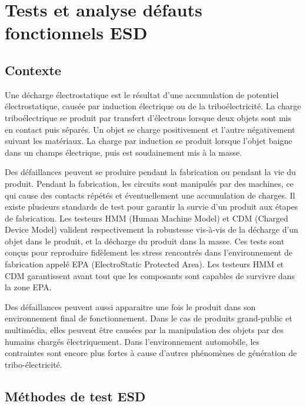 \chapter{Tests et analyse défauts fonctionnels ESD}
\label{chap:1}
\section{Contexte}

Une décharge électrostatique est le résultat d'une accumulation de potentiel électrostatique, causée par induction électrique ou de la triboélectricité.
La charge triboélectrique se produit par transfert d'électrons lorsque deux objets sont mis en contact puis séparés.
Un objet se charge positivement et l'autre négativement suivant les matériaux.
La charge par induction se produit lorsque l'objet baigne dans un champs électrique, puis est soudainement mis à la masse.

Des défaillances peuvent se produire pendant la fabrication ou pendant la vie du produit.
Pendant la fabrication, les circuits sont manipulés par des machines, ce qui cause des contacts répétés et éventuellement une accumulation de charges.
Il existe plusieurs standards de test pour garantir la survie d'un produit aux étapes de fabrication.
Les testeurs HMM (Human Machine Model) et CDM (Charged Device Model) valident respectivement la robustesse vis-à-vis de la décharge d'un objet dans le produit, et la décharge du produit dans la masse.
Ces tests sont conçus pour reproduire fidèlement les stress rencontrés dans l'environnement de fabrication appelé EPA (ElectroStatic Protected Area).
Les testeurs HMM et CDM garantissent avant tout que les composants sont capables de survivre dans la zone EPA.

Des défaillances peuvent aussi apparaitre une fois le produit dans son environnement final de fonctionnement.
Dans le cas de produits grand-public et multimédia, elles peuvent être causées par la manipulation des objets par des humains chargés électriquement.
Dans l'environnement automobile, les contraintes sont encore plus fortes à cause d'autres phénomènes de génération de tribo-électricité.

\section{Méthodes de test ESD}

